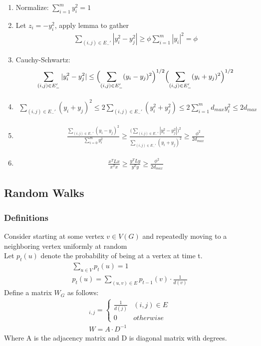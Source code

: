\documentclass[12pt, letterpaper]{report}
\begin{document}
    \begin{enumerate}
        \item Normalize: $\sum_{i=1}^m y_i^2 =1$
        \item Let $z_i=-y_i^2$, apply lemma to gather\begin{gather*}
            \sum_{(i,j)\in E_{-}'}|y_i^2-y_j^2|\geq \phi \sum_{i=1}^{m}|y_i|^2=\phi
        \end{gather*}
        \item Cauchy-Schwartz:\begin{gather*}
            \sum_{(i,j)\in E_{-}'}|y_i^2-y_j^2|\leq \Bigl( \sum_{(i,j)\in E_{-}'}(y_i-y_j)^2 \Bigr) ^{1/2}\Bigl(\sum_{(i,j)\in E_{-}'} (y_i+y_j)^2\Bigr)^{1/2}
        \end{gather*}
        \item \begin{gather*}
            \sum_{(i,j)\in E_{-}'}(y_i+y_j)^2 \leq 2\sum_{(i,j)\in E_{-}'}(y_i^2+y_j^2)\leq 2\sum_{i=1}^{m}d_{max}y_i^2\leq 2d_{max}
        \end{gather*}
        \item \begin{gather*}
            \frac{\sum_{(i,j)\in E_{-}'}(y_i-y_j)^2}{\sum_{i=0}^m y_i^2}\geq\frac{\bigl(\sum_{(i,j)\in E_{-}'}|y_i^2-y_j^2|\bigr)^2}{\sum_{(i,j)\in E_{-}'}(y_i+y_j)^2}\geq\frac{\phi^2}{2d_{max}}
        \end{gather*}
        \item \begin{gather*}
            \frac{x^TLx}{x^Tx}\geq\frac{y^TLy}{y^Ty}\geq\frac{\phi^2}{2d_{max}}
        \end{gather*}
    \end{enumerate}
    \subsection{Random Walks}
    \subsubsection{Definitions}
    Consider starting at some vertex $v \in V(G)$ and repeatedly moving to a neighboring vertex uniformly at random\\
    Let $p_t(u)$ denote the probability of being at a vertex at time t.
    \begin{gather*}
        \sum_{u \in V} p_t(u) = 1\\
        p_t(u) = \sum_{(u,v)\in E} p_{t-1}(v) \cdot \frac{1}{d(v)}
    \end{gather*}
    Define a matrix $W_G$ as follows:
    \begin{gather*}
        [W]_{i,j} = 
        \begin{cases}
            \frac{1}{d(j)} & (i,j) \in E\\
            0 & otherwise
        \end{cases}\\
        W = A \cdot D^{-1}
    \end{gather*}
    Where A is the adjacency matrix and D is diagonal matrix with degrees.\\
\end{document}
